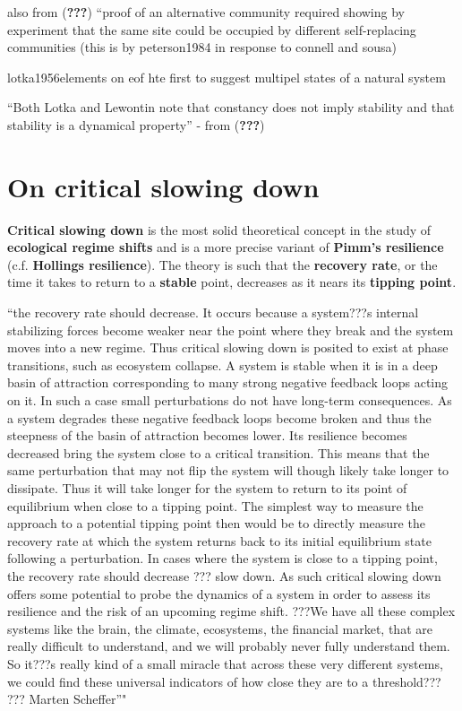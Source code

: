 \documentclass[12pt,twoside,openany]{reedthesis}
\begin{document}
also from ({\textbf{???}}) ``proof of an alternative community required
showing by experiment that the same site could be occupied by different
self-replacing communities (this is by peterson1984 in response to
connell and sousa)

lotka1956elements on eof hte first to suggest multipel states of a
natural system

``Both Lotka and Lewontin note that constancy does not imply stability
and that stability is a dynamical property'' - from ({\textbf{???}})

\section{On critical slowing down}\label{on-critical-slowing-down}

\textbf{Critical slowing down} is the most solid theoretical concept in
the study of \textbf{ecological regime shifts} and is a more precise
variant of \textbf{Pimm's resilience} (c.f. \textbf{Hollings
resilience}). The theory is such that the \textbf{recovery rate}, or the
time it takes to return to a \textbf{stable} point, decreases as it
nears its \textbf{tipping point}.

``the recovery rate should decrease. It occurs because a system???s
internal stabilizing forces become weaker near the point where they
break and the system moves into a new regime. Thus critical slowing down
is posited to exist at phase transitions, such as ecosystem collapse. A
system is stable when it is in a deep basin of attraction corresponding
to many strong negative feedback loops acting on it. In such a case
small perturbations do not have long-term consequences. As a system
degrades these negative feedback loops become broken and thus the
steepness of the basin of attraction becomes lower. Its resilience
becomes decreased bring the system close to a critical transition. This
means that the same perturbation that may not flip the system will
though likely take longer to dissipate. Thus it will take longer for the
system to return to its point of equilibrium when close to a tipping
point. The simplest way to measure the approach to a potential tipping
point then would be to directly measure the recovery rate at which the
system returns back to its initial equilibrium state following a
perturbation. In cases where the system is close to a tipping point, the
recovery rate should decrease ??? slow down. As such critical slowing
down offers some potential to probe the dynamics of a system in order to
assess its resilience and the risk of an upcoming regime shift. ???We
have all these complex systems like the brain, the climate, ecosystems,
the financial market, that are really difficult to understand, and we
will probably never fully understand them. So it???s really kind of a
small miracle that across these very different systems, we could find
these universal indicators of how close they are to a threshold??? ???
Marten Scheffer''"
\end{document}
